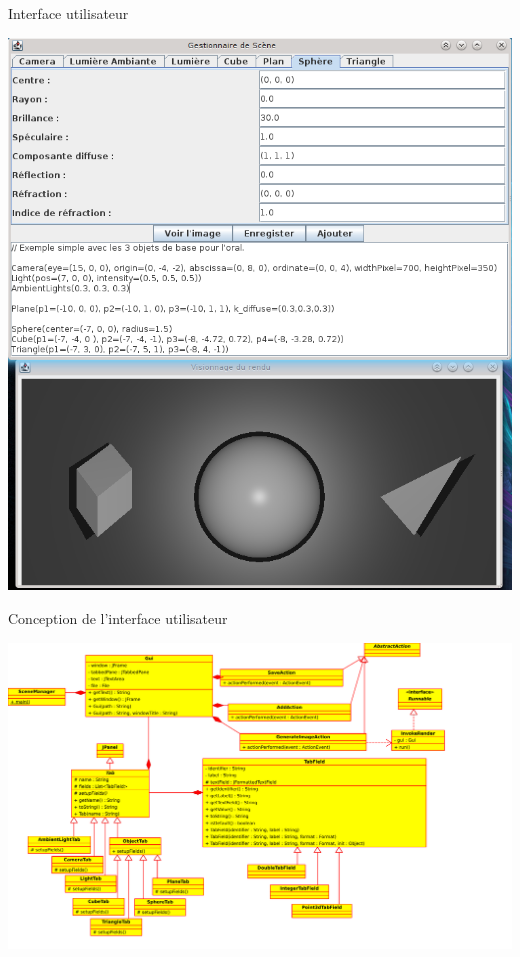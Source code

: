 \documentclass{beamer}
\begin{document}
  \begin{frame}{Interface utilisateur}
    \centerline{
      \includegraphics[height=0.8\paperheight, keepaspectratio=true]
      {screen2.png}
    }
  \end{frame}

  \begin{frame}{Conception de l'interface utilisateur}
      \centerline{\includegraphics[width=0.95\paperwidth]{guiuml.pdf}}
  \end{frame}
\end{document}
